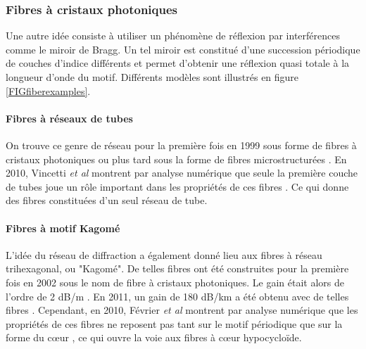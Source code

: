 \subsubsection{Fibres à cristaux photoniques}

Une autre idée consiste à utiliser un phénomène de réflexion par interférences comme le miroir de Bragg. Un tel miroir est constitué d'une succession périodique de couches d'indice différents et permet d'obtenir une réflexion quasi totale à la longueur d'onde du motif. Différents modèles sont illustrés en figure \ref{FIGfiberexamples}.

\paragraph{Fibres à réseaux de tubes}
On trouve ce genre de réseau pour la première fois en 1999 sous forme de fibres à cristaux photoniques \cite{cregan_single-mode_1999} ou plus tard sous la forme de fibres microstructurées \cite{argyros_hollow-core_2006}. En 2010, Vincetti \emph{et al} montrent par analyse numérique que seule la première couche de tubes joue un rôle important dans les propriétés de ces fibres \cite{vincetti_waveguiding_2010}. Ce qui donne des fibres constituées d'un seul réseau de tube.

\paragraph{Fibres à motif Kagomé}
L'idée du réseau de diffraction a également donné lieu aux fibres à réseau trihexagonal, ou "Kagomé". De telles fibres ont été construites pour la première fois en 2002 sous le nom de fibre à cristaux photoniques. Le gain était alors de l'ordre de 2 dB/m \cite{benabid_stimulated_2002}. En 2011, un gain de 180 dB/km a été obtenu avec de telles fibres \cite{wang_low_2011}.
Cependant, en 2010, Février \emph{et al} montrent par analyse numérique que les propriétés de ces fibres ne reposent pas tant sur le motif périodique que sur la forme du cœur \cite{fevrier_understanding_2010}, ce qui ouvre la voie aux fibres à cœur hypocycloïde. 


